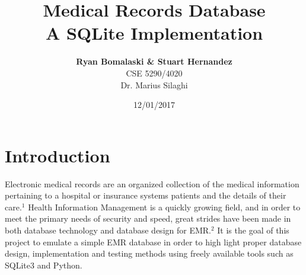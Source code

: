 \documentclass[12pt]{article}
\theoremstyle{plain}
\theoremstyle{definition}
\begin{document}
\title{Medical Records Database\\
\large A SQLite Implementation}\author{\textbf{ Ryan Bomalaski \& Stuart Hernandez} \\ CSE 5290/4020\\ Dr. Marius Silaghi}
\date{12/01/2017}
\maketitle


\section*{Introduction}
Electronic medical records are an organized collection of the medical information pertaining to a hospital or insurance systems patients and the details of their care.$^{1}$  Health Information Management is a quickly growing field, and in order to meet the primary needs of security and speed, great strides have been made in both database technology and database design for EMR.$^{2}$ It is the goal of this project to emulate a simple EMR database in order to high light proper database design, implementation and testing methods using freely available tools such as SQLite3 and Python.
\\
\end{document}
